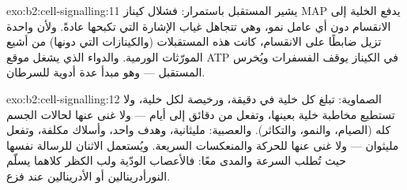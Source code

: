 \begin{solution}{exo:b2:cell-signalling:11}
يشير المستقبل باستمرار: فشلال كيناز MAP يدفع
الخلية إلى الانقسام دون أي عامل نمو، وهي تتجاهل
غياب الإشارة التي تكبحها عادةً. ولأن  واحدة
تزيل ضابطًا على الانقسام، كانت هذه المستقبلات (والكينازات
التي دونها) من أشيع المورّثات الورمية. والدواء الذي
يشغل موقع ATP في الكيناز يوقف الفسفرات
ويُخرس المستقبل --- وهو مبدأ عدة أدوية للسرطان.
\end{solution}

\begin{solution}{exo:b2:cell-signalling:12}
الصماوية: تبلغ كل خلية في دقيقة، ورخيصة لكل خلية، ولا تستطيع
مخاطبة خلية بعينها، وتفعل من دقائق إلى أيام --- ولا غنى عنها
لحالات الجسم كله (الصيام، والنمو، والتكاثر). والعصبية:
مليثانية، وهدف واحد، وأسلاك مكلفة، وتفعل مليثوان
--- ولا غنى عنها للحركة والمنعكسات السريعة. ويُستعمل الاثنان
للرسالة نفسها حيث تُطلب السرعة والمدى معًا: فالأعصاب
الودّية ولب الكظر كلاهما يسلّم
النورأدرينالين أو الأدرينالين عند فزع.
\end{solution}

